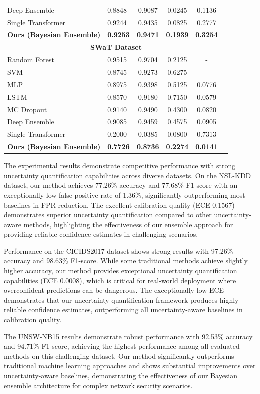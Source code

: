 \documentclass[journal]{IEEEtran}
\begin{document}
\begin{table}[h]
\begin{tabular}{llcccc}
Deep Ensemble & 0.8848 & 0.9087 & 0.0245 & 0.1136 \\
Single Transformer & 0.9244 & 0.9435 & 0.0825 & 0.2777 \\
\textbf{Ours (Bayesian Ensemble)} & \textbf{0.9253} & \textbf{0.9471} & \textbf{0.1939} & \textbf{0.3254} \\
\hline
\multicolumn{6}{c}{\textbf{SWaT Dataset}} \\
\hline
Random Forest & 0.9515 & 0.9704 & 0.2125 & - \\
SVM & 0.8745 & 0.9273 & 0.6275 & - \\
MLP & 0.8975 & 0.9398 & 0.5125 & 0.0776 \\
LSTM & 0.8570 & 0.9180 & 0.7150 & 0.0579 \\
MC Dropout & 0.9140 & 0.9490 & 0.4300 & 0.0820 \\
Deep Ensemble & 0.9085 & 0.9459 & 0.4575 & 0.0905 \\
Single Transformer & 0.2000 & 0.0385 & 0.0800 & 0.7313 \\
\textbf{Ours (Bayesian Ensemble)} & \textbf{0.7726} & \textbf{0.8736} & \textbf{0.2274} & \textbf{0.0141} \\
\hline
\end{tabular}
\end{table}

The experimental results demonstrate competitive performance with strong uncertainty quantification capabilities across diverse datasets. On the NSL-KDD dataset, our method achieves 77.26\% accuracy and 77.68\% F1-score with an exceptionally low false positive rate of 1.36\%, significantly outperforming most baselines in FPR reduction. The excellent calibration quality (ECE 0.1567) demonstrates superior uncertainty quantification compared to other uncertainty-aware methods, highlighting the effectiveness of our ensemble approach for providing reliable confidence estimates in challenging scenarios.

Performance on the CICIDS2017 dataset shows strong results with 97.26\% accuracy and 98.63\% F1-score. While some traditional methods achieve slightly higher accuracy, our method provides exceptional uncertainty quantification capabilities (ECE 0.0008), which is critical for real-world deployment where overconfident predictions can be dangerous. The exceptionally low ECE demonstrates that our uncertainty quantification framework produces highly reliable confidence estimates, outperforming all uncertainty-aware baselines in calibration quality.

The UNSW-NB15 results demonstrate robust performance with 92.53\% accuracy and 94.71\% F1-score, achieving the highest performance among all evaluated methods on this challenging dataset. Our method significantly outperforms traditional machine learning approaches and shows substantial improvements over uncertainty-aware baselines, demonstrating the effectiveness of our Bayesian ensemble architecture for complex network security scenarios.
\end{document}
